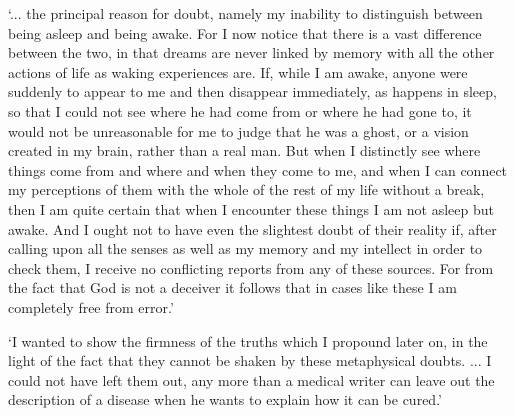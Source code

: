 \documentclass[12pt]{extarticle}
\begin{document}
\begin{multicols*}{3}
‘... the principal reason for doubt, namely my inability
to distinguish between being asleep and being awake. For I now notice that
there is a vast difference between the two, in that dreams are never linked by
memory with all the other actions of life as waking experiences are.
If, while
I am awake, anyone were suddenly to appear to me and then disappear
immediately, as happens in sleep, so that I could not see where he had come
from or where he had gone to, it would not be unreasonable for me to judge that
he was a ghost, or a vision created in my brain, rather than a real man. But
when I distinctly see where things come from and where and when they come to
me, and when I can connect my perceptions of them with the whole of the rest of
my life without a break, then I am quite certain that when I encounter these
things I am not asleep but awake. And I ought not to have even the slightest
doubt of their reality if, after calling upon all the senses as well as my
memory and my intellect in order to check them, I receive no conflicting
reports from any of these sources. For from the fact that God is not a deceiver
it follows that in cases like these I am completely free from error.’
\citep[p.~61--2, AT VII:89--90]{descartes:1985_csm2}
 
‘I wanted to show the firmness of the truths which I propound later on, in the
light of the fact that they cannot be shaken by these metaphysical doubts.
...
I could not have left them out, any more than a medical writer can leave out the description of a disease when he wants to explain how it can be cured.’ 
\citep[p.~121, AT VII:172]{descartes:1985_csm2}
 

    







\footnotesize


\end{multicols*}
\end{document}
